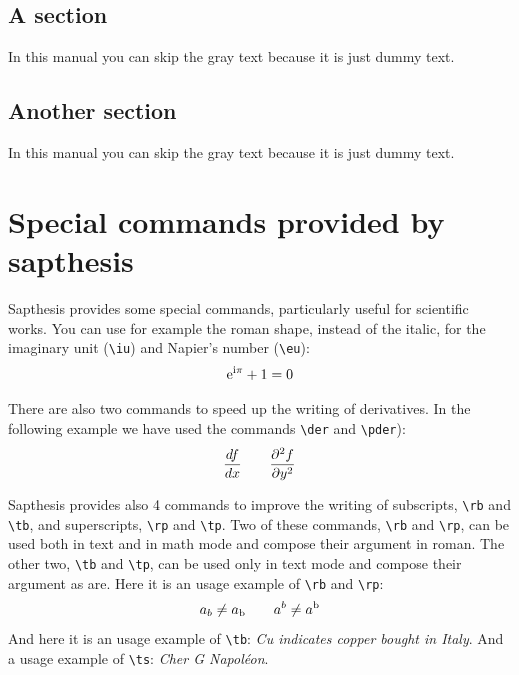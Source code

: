 \documentclass[LaM,binding=0.6cm]{sapthesis}
\newcommand{\bs}{\textbackslash}
\begin{document}
\section{A section}

In this manual you can skip the gray text because it is just dummy text.

\textcolor{gray}{\lipsum[1-10]}



\section{Another section}

In this manual you can skip the gray text because it is just dummy text.

\textcolor{gray}{\lipsum}


\appendix
\chapter{Special commands provided by \textsf{sapthesis}}

\textsf{Sapthesis} provides some special commands, particularly useful for scientific works. You can use for example the roman shape, instead of the italic, for the imaginary unit (\texttt{\bs iu}) and Napier's number (\texttt{\bs eu}):
\begin{equation}
\mathrm{e}^{\mathrm{i}\pi}+1=0
\end{equation}

There are also two commands to speed up the writing of derivatives. In the following example we have used the commands \texttt{\bs der} and \texttt{\bs pder}):
\begin{equation}
\der{f}{x} \qquad \pder[2]{f}{y}
\end{equation}


\textsf{Sapthesis} provides also 4 commands to improve the writing of subscripts, \texttt{\bs rb} and \texttt{\bs tb}, and superscripts, \texttt{\bs rp} and \texttt{\bs tp}. Two of these commands, \texttt{\bs rb} and \texttt{\bs rp}, can be used both in text and in math mode and compose their argument in roman. The other two, \texttt{\bs tb} and \texttt{\bs tp}, can be used only in text mode and compose their argument as are. Here it is an usage example of \texttt{\bs rb} and \texttt{\bs rp}:
\[
a_b \neq a_\mathrm{b}\qquad a^b \neq a^\mathrm{b}
\]
And here it is an usage example of \texttt{\bs tb}: \emph{Cu indicates copper bought in Italy}. And a usage example of \texttt{\bs ts}: \emph{Cher G Napol\'eon}.
\end{document}
